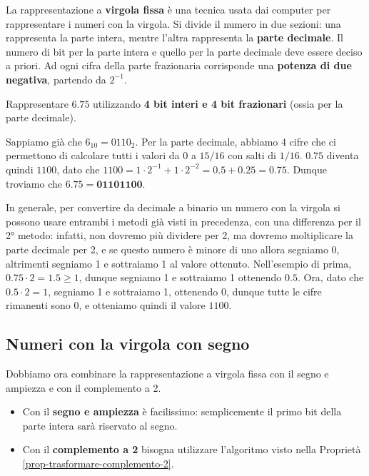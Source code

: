 \documentclass[11pt, a4paper, titlepage, oneside]{scrbook}
\begin{document}
\begin{Proprieta}
\label{prop-rappr-virgola-fissa}
La rappresentazione a \textbf{virgola fissa} è una tecnica usata dai computer per rappresentare i numeri con la virgola. Si divide il numero in due sezioni: una rappresenta la parte intera, mentre l'altra rappresenta la \textbf{parte decimale}. Il numero di bit per la parte intera e quello per la parte decimale deve essere deciso a priori. Ad ogni cifra della parte frazionaria corrisponde una \textbf{potenza di due negativa}, partendo da $2^{-1}$.
\end{Proprieta}

\Esempio \nopagebreak

Rappresentare $\bm{6.75}$ utilizzando \textbf{4 bit interi e 4 bit frazionari} (ossia per la parte decimale). \nopagebreak

Sappiamo già che $6_{10} = 0110_2$. Per la parte decimale, abbiamo 4 cifre  che ci permettono di calcolare tutti i valori da 0 a $15/16$ con salti di $1/16$. $0.75$ diventa quindi $1100$, dato che $1100 = 1 \cdot 2^{-1} + 1 \cdot 2^{-2} = 0.5 + 0.25 =  0.75$. Dunque troviamo che $\bm{6.75 = 01101100}$.

In generale, per convertire da decimale a binario un numero con la virgola si possono usare entrambi i metodi già visti in precedenza, con una differenza per il 2° metodo: infatti, non dovremo più dividere per 2, ma dovremo moltiplicare la parte decimale per 2, e se questo numero è minore di uno allora segniamo 0, altrimenti segniamo 1 e sottraiamo 1 al valore ottenuto. Nell'esempio di prima, $0.75 \cdot 2 = 1.5 \geq 1$, dunque segniamo 1 e sottraiamo 1 ottenendo $0.5$. Ora, dato che $0.5 \cdot 2 = 1$, segniamo 1 e sottraiamo 1, ottenendo 0, dunque tutte le cifre rimanenti sono 0, e otteniamo quindi il valore $1100$.

\subsection{Numeri con la virgola con segno}

Dobbiamo ora combinare la rappresentazione a virgola fissa con il segno e ampiezza e con il complemento a 2.

\begin{itemize}
    \item Con il \textbf{segno e ampiezza} è facilissimo: semplicemente il primo bit della parte intera sarà riservato al segno.
    \item Con il \textbf{complemento a 2} bisogna utilizzare l'algoritmo visto nella Proprietà \ref{prop-trasformare-complemento-2}. 
\end{itemize}
\end{document}
